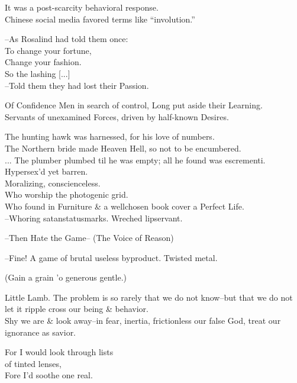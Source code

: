 \secdiv

It was a post-scarcity behavioral response. \\
Chinese social media favored terms like ``involution.''

--As Rosalind had told them once: \\
\qquad To change your fortune, \\
\qquad Change your fashion. \\
\qquad So the lashing [...] \\
--Told them they had lost their Passion.

Of Confidence Men in search of control, Long put aside their Learning. \\
Servants of unexamined Forces, driven by half-known Desires. 

The hunting hawk was harnessed, for his love of numbers. \\
The Northern bride made Heaven Hell, so not to be encumbered. \\
...
The plumber plumbed til he was empty; all he found was escrementi. \\

Hypersex'd yet barren. \\
Moralizing, conscienceless. \\
Who worship the photogenic grid. \\
Who found in Furniture \& a wellchosen book cover a Perfect Life. \\

--Whoring satanstatusmarks. Wreched lipservant.

--Then Hate the Game-- (The Voice of Reason)

--Fine! A game of brutal useless byproduct. Twisted metal.

(Gain a grain 'o generous gentle.)

Little Lamb. The problem is so rarely that we do not know--but that we do not let it ripple cross our being \& behavior. \\
Shy we are \& look away--in fear, inertia, frictionless our false God, treat our ignorance as savior.

For I would look through lists \\
\qquad of tinted lenses, \\
Fore I'd soothe one real.